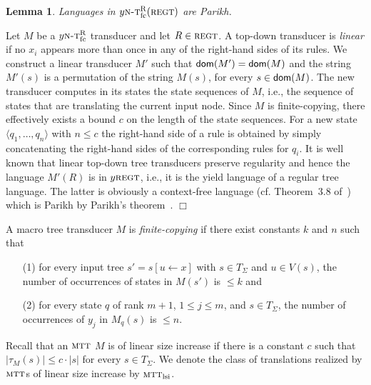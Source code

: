 \documentclass[copyright,creativecommons]{eptcs}
\newtheorem{lemma}{Lemma}
\newcommand{\eop}{\hspace*{\fill}$\Box$}
\newenvironment{proof}{{\it Proof.}\quad}{\eop\vspace*{4mm}}
\newcommand{\dom}[1]{{\sf dom}(#1)}
\newcommand{\ntrfc}{\textsc{n-t}^{\text{R}}_{\text{fc}}}
\newcommand{\mtt}{\textsc{mtt}}
\newcommand{\mttlsi}{\textsc{mtt}_{\text{lsi}}}
\newcommand{\regt}{\textsc{regt}}
\begin{document}
\begin{lemma}\rm\label{lm:nParikh}
Languages in $y\ntrfc(\regt)$ are Parikh.
\end{lemma}
\begin{proof}
Let $M$ be a $y\ntrfc$ transducer and let $R\in\regt$.
A top-down transducer is \emph{linear} if no $x_i$ appears more than once
in any of the right-hand sides of its rules.
We construct a linear
transducer $M'$ such that $\dom{M'}=\dom{M}$ and 
the string $M'(s)$ is a permutation of the string $M(s)$, for every $s\in\dom{M}$.
The new transducer computes in its states the state sequences of $M$, i.e.,
the sequence of states that are translating the current input node.
Since $M$ is finite-copying, there effectively exists a bound $c$ on the
length of the state sequences. For a new state $\langle q_1,\dots, q_n\rangle$
with $n\leq c$ the right-hand side of a rule is obtained by simply concatenating the 
right-hand sides of the corresponding rules for $q_i$.
It is well known that linear top-down tree transducers preserve regularity 
and hence the language $M'(R)$ is in $y\regt$, i.e., 
it is the yield language of a regular tree language.
The latter is obviously a context-free language 
(cf. Theorem~3.8 of~\cite{DBLP:journals/jcss/Thatcher70}) which is
Parikh by Parikh's theorem~\cite{DBLP:journals/jacm/Parikh66}.
\end{proof}

A macro tree transducer $M$ is \emph{finite-copying} if there exist constants $k$ and $n$ 
such that 
\begin{enumerate}
\item[(1)] for every input tree $s'=s[u\leftarrow x]$ with $s\in T_\Sigma$ and $u\in V(s)$, 
the number of occurrences of states in $M(s')$ is $\leq k$ and
\item[(2)] for every state $q$ of rank $m+1$, $1\leq j\leq m$, and $s\in T_\Sigma$, the number of occurrences
of $y_j$ in $M_q(s)$ is $\leq n$.
\end{enumerate}

Recall that an $\mtt$ $M$ is of linear size increase if there is a constant $c$ 
such that $|\tau_M(s)|\leq c\cdot |s|$ for every $s\in T_\Sigma$. 
We denote the class of translations realized by $\mtt$s of linear size increase
by $\mttlsi$.
\end{document}

